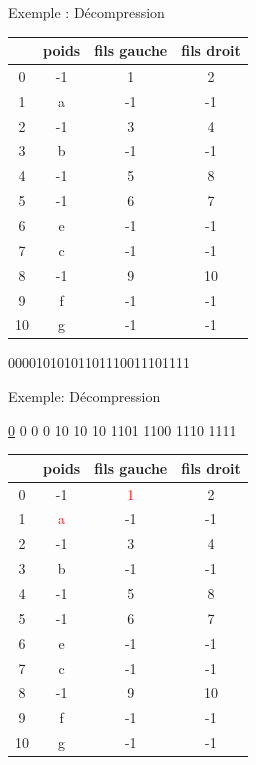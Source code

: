 \documentclass[french]{beamer}
\begin{document}
\begin{frame}{Exemple : Décompression}
	\begin{center}	
		\begin{tabular}{|c|c|c|c|}
		\hline
		 & poids & fils gauche & fils droit \\
		\hline 0 & -1 & 1 & 2 \\
		\hline 1 & a & -1 & -1\\
		\hline  2 & -1 & 3 & 4 \\
		\hline 3& b & -1 & -1 \\
		\hline 4&-1 & 5 & 8 \\
		\hline 5&-1 & 6 & 7 \\
		\hline 6&e & -1 & -1 \\
		\hline 7&c & -1 & -1 \\
		\hline 8& -1 & 9 & 10 \\
		\hline 9&f & -1 & -1\\
		\hline 10&g & -1 & -1\\
		\hline
		\end{tabular}
	\end{center}
	\begin{center}
	00001010101101110011101111\\
	\end{center}
	
\end{frame}

\begin{frame}{Exemple: Décompression}
	\begin{center}
	\underline{0} 0 0 0 10 10 10 1101 1100 1110 1111\\
	\end{center}
		\begin{center}	
		\begin{tabular}{|c|c|c|c|}
		\hline
		 & poids & fils gauche & fils droit \\
		\hline 0 & -1 & \textcolor{red}{1} & 2 \\
		\hline 1 & \textcolor{red}{a} & -1 & -1\\
		\hline  2 & -1 & 3 & 4 \\
		\hline 3& b & -1 & -1 \\
		\hline 4&-1 & 5 & 8 \\
		\hline 5&-1 & 6 & 7 \\
		\hline 6&e & -1 & -1 \\
		\hline 7&c & -1 & -1 \\
		\hline 8& -1 & 9 & 10 \\
		\hline 9&f & -1 & -1\\
		\hline 10&g & -1 & -1\\
		\hline
		\end{tabular}
	\end{center}
	
\end{frame}
\end{document}
